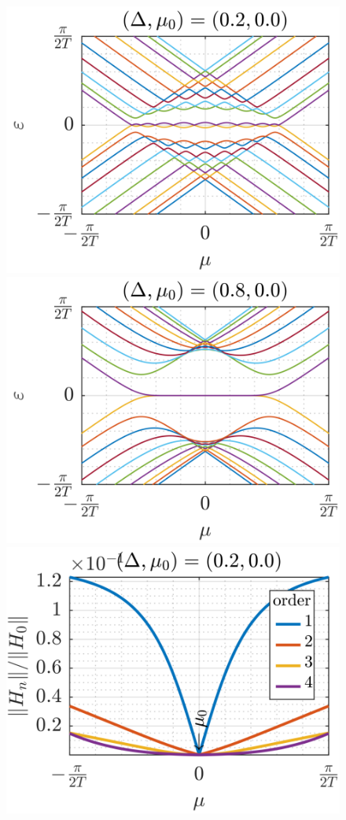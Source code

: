\documentclass[11pt]{report}
\begin{document}
\begin{figure}
\includegraphics[scale=1]{Figures/New/Quasienergies_Expansion1.png}%
\includegraphics[scale=1]{Figures/New/Quasienergies_Expansion2.png}\\
\includegraphics[scale=1]{Figures/New/Expansion_Amplitude1.png}%

\end{figure}
\end{document}
